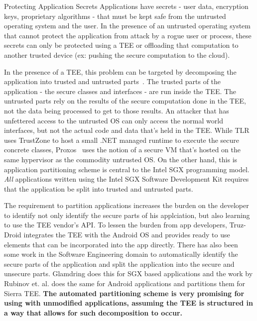 \begin{subsection}{Protecting Application Secrets}
Applications have secrets - user data, encryption keys, proprietary algorithms -
that must be kept safe from the untrusted operating system and the user. In the
presence of an untrusted operating system that cannot protect the application
from attack by a rogue user or process, these secrets can only be protected
using a TEE or offloading that computation to another trusted device (ex:
pushing the secure computation to the cloud). 

In the presence of a TEE, this problem can be targeted by decomposing the
application into trusted and untrusted parts~\cite{TLR,Proxos}. The trusted
parts of the application - the secure classes and interfaces - are run inside
the TEE. The untrusted  parts rely on the results of the secure computation done
in the TEE, not the data being processed to get to those results. An attacker
that has unfettered access to the untrusted OS can only access the normal world
interfaces, but not the actual code and data that's held in the TEE. While
TLR~\cite{TLR} uses TrustZone to host a small .NET managed runtime to execute
the secure concrete classes, Proxos~\cite{Proxos} uses the notion of a secure VM
that's hosted on the same hypervisor as the commodity untrusted OS. On the other
hand, this is application partitioning scheme is central to the Intel SGX
programming model. \emph{All} applications written using the Intel SGX Software
Development Kit requires that the application be split into trusted and
untrusted parts.

The requirement to partition applications increases the burden on the developer
to identify not only identify the secure parts of his applciation, but also
learning to use the TEE vendor's API. To lessen the burden from app developers,
Truz-Droid\cite{ying18truzdroid} integrates the TEE with the Android OS and
provides ready to use elements that can be incorporated into the app directly.
There has also been some work in the Software Engineering domain to
automatically identify the secure parts of the application and split the
application into the secure and unsecure parts. Glamdring
\cite{lind2017glamdring} does this for SGX based applications and the work by
Rubinov et. al.\cite{rubinov2016automated} does the same for Android
applications and partitions them for Sierra TEE\cite{sierratee}. \textbf{The
automated partitioning scheme is very promising for using with unmodified
applications, assuming the TEE is structured in a way that allows for such
decomposition to occur.}


\end{subsection}
